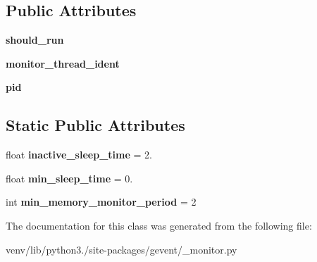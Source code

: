 \subsection*{Public Attributes}
\begin{DoxyCompactItemize}
\item 
\mbox{\label{classgevent_1_1__monitor_1_1_periodic_monitoring_thread_a208d93b019f78ce54d1436bc33a775be}} 
{\bfseries should\+\_\+run}
\item 
\mbox{\label{classgevent_1_1__monitor_1_1_periodic_monitoring_thread_a61a900639aef3a48be431bd5c030c4b9}} 
{\bfseries monitor\+\_\+thread\+\_\+ident}
\item 
\mbox{\label{classgevent_1_1__monitor_1_1_periodic_monitoring_thread_a6a5fed96be43ff5ffc462f86825b67c9}} 
{\bfseries pid}
\end{DoxyCompactItemize}
\subsection*{Static Public Attributes}
\begin{DoxyCompactItemize}
\item 
\mbox{\label{classgevent_1_1__monitor_1_1_periodic_monitoring_thread_a8dfd616a789158417f2f57d9e0169add}} 
float {\bfseries inactive\+\_\+sleep\+\_\+time} = 2.
\item 
\mbox{\label{classgevent_1_1__monitor_1_1_periodic_monitoring_thread_a628a8002bf8dab39d140e991c371cd0e}} 
float {\bfseries min\+\_\+sleep\+\_\+time} = 0.
\item 
\mbox{\label{classgevent_1_1__monitor_1_1_periodic_monitoring_thread_a1e6b91fdc2cd234cfb104f8a09071ddb}} 
int {\bfseries min\+\_\+memory\+\_\+monitor\+\_\+period} = 2
\end{DoxyCompactItemize}


The documentation for this class was generated from the following file\+:\begin{DoxyCompactItemize}
\item 
venv/lib/python3./site-\/packages/gevent/\+\_\+monitor.\+py\end{DoxyCompactItemize}
